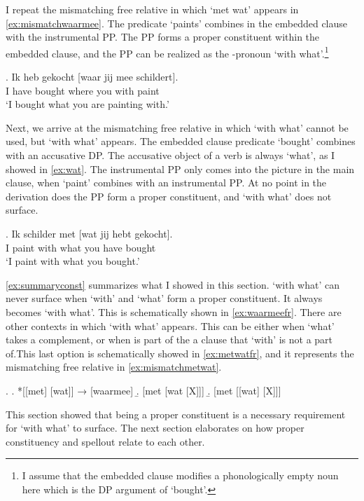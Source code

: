 \documentclass{article}
\begin{document}
I repeat the mismatching free relative in which  `met wat' appears in \ref{ex:mismatchwaarmee}. The predicate  `paints' combines in the embedded clause with the instrumental PP. The PP forms a proper constituent within the embedded clause, and the PP can be realized as the -pronoun  `with what'.\footnote{I assume that the embedded clause modifies a phonologically empty noun here which is the DP argument of  `bought'.}

\exg. Ik heb gekocht [waar jij mee schildert].\\
 I have bought where you with paint\\
 `I bought what you are painting with.'\label{ex:mismatchwaarmee}

Next, we arrive at the mismatching free relative in which  `with what' cannot be used, but  `with what' appears. The embedded clause predicate  `bought' combines with an accusative DP. The accusative object of a verb is always  `what', as I showed in \ref{ex:wat}. The instrumental PP only comes into the picture in the main clause, when  `paint' combines with an instrumental PP. At no point in the derivation does the PP form a proper constituent, and  `with what' does not surface.

\exg. Ik schilder met [wat jij hebt gekocht].\\
 I paint with what you have bought\\
 `I paint with what you bought.'\label{ex:mismatchmetwat}

\ref{ex:summaryconst} summarizes what I showed in this section.  `with what' can never surface when  `with' and  `what' form a proper constituent. It always becomes  `with what'. This is schematically shown in \ref{ex:waarmeefr}.
There are other contexts in which  `with what' appears. This can be either when  `what' takes a complement, or when  is part of the a clause that  `with' is not a part of.This last option is schematically showed in \ref{ex:metwatfr}, and it represents the mismatching free relative in \ref{ex:mismatchmetwat}.

\ex.\label{ex:summaryconst}
\a. *[[met] [wat]] → [waarmee]\label{ex:waarmeefr}
\b. [met [wat [X]]]
\b. [met [[wat] [X]]]\label{ex:metwatfr}

This section showed that being a proper constituent is a necessary requirement for  `with what' to surface. The next section elaborates on how proper constituency and spellout relate to each other.
\end{document}

